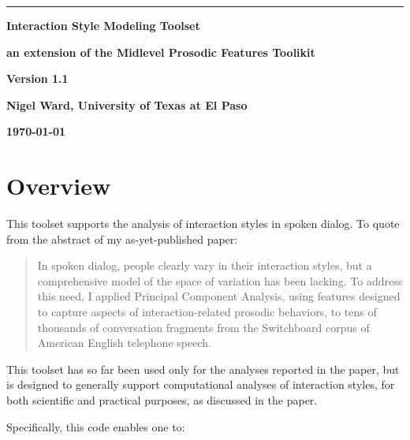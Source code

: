 \documentclass[11pt]{article}
\begin{document}
\noindent
\thispagestyle{empty}
\sloppy

\rule{1mm}{0mm}

\vspace{-17mm}
{\LARGE \bf Interaction Style Modeling  Toolset }

\smallskip
{\large \bf an extension of the  Midlevel Prosodic Features Toolikit}
\medskip


{\LARGE \bf Version 1.1}
\vspace{7mm}


{\bf Nigel Ward, University of Texas at El Paso}

{\bf \today }
\bigskip


\vspace{-3.5ex}
\section{Overview}    \label{sec:overview}

This toolset supports the analysis of interaction styles in spoken
dialog.  To quote from the abstract of  my as-yet-published paper:

\begin{quote}
  In spoken dialog, people clearly vary in their interaction styles,
  but a comprehensive model of the space of variation has been
  lacking.  To address this need, I applied Principal Component
  Analysis, using features designed to capture aspects of
  interaction-related prosodic behaviors, to tens of thousands of conversation
  fragments from the Switchboard corpus of American English telephone
  speech. 
\end{quote}


This toolset has so far been used only for the analyses reported in
the paper, but is designed to generally support computational
analyses of interaction styles, for both scientific and practical
purposes, as discussed in the paper.

Specifically, this code enables one to:
\end{document}
